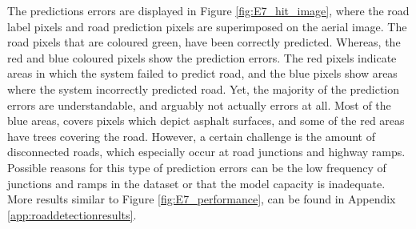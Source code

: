 The predictions errors are displayed in Figure \ref{fig:E7_hit_image}, where the road label pixels and road prediction pixels are superimposed on the aerial image. The road pixels that are coloured green, have been correctly predicted. Whereas, the red and blue coloured pixels show the prediction errors. The red pixels indicate areas in which the system failed to predict road, and the blue pixels show areas where the system incorrectly predicted road. Yet, the majority of the prediction errors are understandable, and arguably not actually errors at all. Most of the blue areas, covers pixels which depict asphalt surfaces, and some of the red areas have trees covering the road. However, a certain challenge is the amount of disconnected roads, which especially occur at road junctions and highway ramps. Possible reasons for this type of prediction errors can be the low frequency of junctions and ramps in the dataset or that the model capacity is inadequate. More results similar to Figure \ref{fig:E7_performance}, can be found in Appendix \ref{app:roaddetectionresults}.\\



